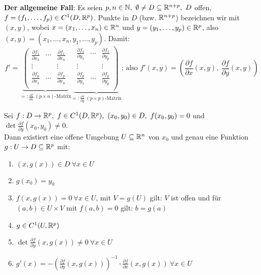 \documentclass[a4paper,oneside,DIV15,BCOR12mm,chapterprefix=true,headings=onelinechapter]{scrbook}
\begin{document}
\textbf{Der allgemeine Fall}:
Es seien $p,n\in\MdN,\ \emptyset\ne D\subseteq\MdR^{n+p},\ D$ offen, $f=(f_1,\ldots, f_p) \in C^1(D,\mathbb{R}^p)$. Punkte in $D$ (bzw. $\mathbb{R}^{n+p}$) bezeichnen wir mit $(x,y)$, wobei $x=(x_1,\ldots, x_n)\in\mathbb{R}^n$ und $y=(y_1,\ldots, y_p)\in\mathbb{R}^p$, also $(x,y)=(x_1,\dots,x_n,y_1,\ldots,y_p)$. Damit:
$$ f'=
\underbrace{
\left(
\begin{array}{ccc|}
\frac{\partial f_1}{\partial x_1} & \cdots & \frac{\partial f_1}{\partial x_n} \\
\vdots & & \vdots \\
\frac{\partial f_p}{\partial x_1} & \cdots & \frac{\partial f_p}{\partial x_n} \\
\end{array}
\right.
}_{=:\frac{\partial f}{\partial x}\ (p \times n)\text{-Matrix}}
\underbrace{
\left.
\begin{array}{ccc}
\frac{\partial f_1}{\partial y_1} & \cdots & \frac{\partial f_1}{\partial y_p} \\
\vdots & & \vdots \\
\frac{\partial f_p}{\partial y_1} & \cdots & \frac{\partial f_p}{\partial y_p} \\
\end{array}
\right)
}_{=:\frac{\partial f}{\partial y}\ (p\times p)\text{-Matrix}}
\text{; also } f'(x,y)=\left(\frac{\partial f}{\partial x}(x,y),\ \frac{\partial f}{\partial y}(x,y)\right)$$

\begin{satz}
Sei $f:D \rightarrow \mathbb{R}^p,\ f \in C^1(D, \mathbb{R}^p),\ (x_0, y_0) \in D,\ f(x_0, y_0)=0$ und 
$\det\frac{\partial f}{\partial y}(x_0, y_0)\ne 0$. \\ 
Dann existiert eine offene Umgebung $U\subseteq \mathbb{R}^n$ von $x_0$ und
genau eine Funktion $g:U\to D \subseteq \mathbb{R}^p$ mit:
    \begin{enumerate}
        \item $(x, g(x))\in D\ \forall x\in U$
        \item $g(x_0)=y_0$
        \item $f(x,g(x))=0\ \forall x\in U$, mit $V = g(U)$ gilt: 
              $V$ ist offen und für $(a, b) \in U \times V$ mit 
              $f(a,b) = 0$ gilt: $b = g(a)$
        \item $g \in C^1(U,\mathbb{R}^p)$
        \item $\det\frac{\partial f}{\partial y}(x, g(x))\ne0\ \forall x\in U$
        \item $g'(x)=-\left(\frac{\partial f}{\partial y}(x, g(x))\right)^{-1} \cdot \frac{\partial f}{\partial x}(x, g(x))\ \forall x\in U$
    \end{enumerate}
\end{satz}
\end{document}
